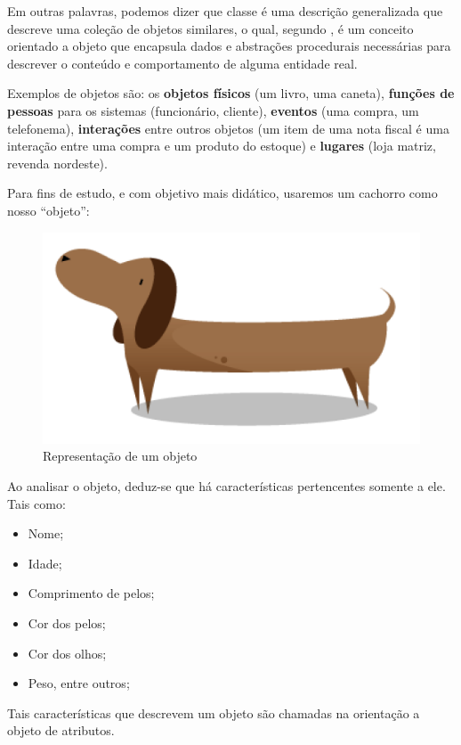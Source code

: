Em outras palavras, podemos dizer que classe é uma descrição generalizada que
descreve uma coleção de objetos similares, o qual, segundo 
, é um conceito orientado a objeto que 
encapsula dados e abstrações procedurais necessárias para descrever o conteúdo 
e comportamento de alguma entidade real.

Exemplos de objetos são: os \textbf{objetos físicos} (um livro, uma caneta), \textbf{funções de pessoas} para os sistemas (funcionário, cliente), \textbf{eventos} (uma compra, um  telefonema), \textbf{interações} entre outros objetos (um item de uma nota fiscal é uma interação entre uma compra e um produto do estoque) e \textbf{lugares} (loja matriz, revenda nordeste).

Para fins de estudo, e com objetivo mais didático, usaremos um cachorro como 
nosso ``objeto'':

\begin{figure}[H]
  \centering
  \includegraphics[scale=0.4]{imagens/cachorro-objeto.png}
  \caption{Representação de um objeto}
  \label{fig:cachorro-objeto}
\end{figure}

Ao analisar o objeto, deduz-se que há características pertencentes somente a 
ele. Tais como:

\begin{itemize}
  \item Nome;
  \item Idade;
  \item Comprimento de pelos;
  \item Cor dos pelos;
  \item Cor dos olhos;
  \item Peso, entre outros;
\end{itemize}

Tais características que descrevem um objeto são chamadas na orientação a  objeto de atributos.

